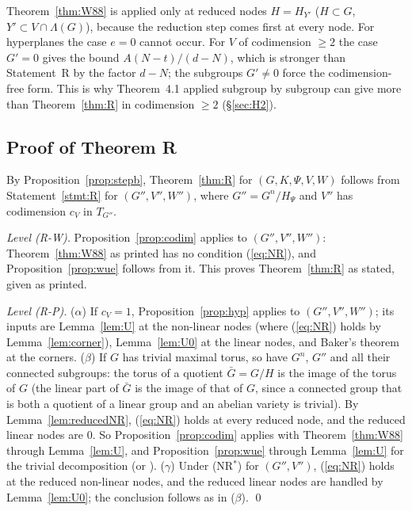 \documentclass[11pt]{amsart}
\theoremstyle{definition}
\begin{document}
\noindent Theorem~\ref{thm:W88} is applied only at reduced nodes $H=H_{Y'}$ ($H\subset G$, $Y'\subset V\cap\Lambda(G)$), because
the reduction step comes first at every node. For hyperplanes the case $e=0$ cannot occur. For $V$ of codimension $\ge2$
the case $G'=0$ gives the bound $A(N-t)/(d-N)$, which is stronger than Statement~R by the factor $d-N$; the subgroups
$G'\ne0$ force the codimension-free form. This is why Theorem~4.1 applied subgroup by subgroup can give more than
Theorem~\ref{thm:R} in codimension $\ge2$ (\S\ref{sec:H2}).

\subsection{Proof of Theorem R}\label{sec:proofRfin}
By Proposition~\ref{prop:stepb}, Theorem~\ref{thm:R} for $(G,K,\Psi,V,W)$ follows from Statement~\ref{stmt:R} for
$(G'',V'',W'')$, where $G''=G^n/H_\Psi$ and $V''$ has codimension $c_V$ in $T_{G''}$.

\emph{Level (R-W).} Proposition~\ref{prop:codim} applies to $(G'',V'',W'')$: Theorem~\ref{thm:W88} as printed has no
condition (\ref{eq:NR}), and Proposition~\ref{prop:wue} follows from it. This proves Theorem~\ref{thm:R} as stated, given
\cite[Thm.~4.1]{W88} as printed.

\emph{Level (R-P).}
($\alpha$) If $c_V=1$, Proposition~\ref{prop:hyp} applies to $(G'',V'',W'')$; its inputs are Lemma~\ref{lem:U} at the
non-linear nodes (where (\ref{eq:NR}) holds by Lemma~\ref{lem:corner}), Lemma~\ref{lem:U0} at the linear nodes, and Baker's
theorem at the corners.
($\beta$) If $G$ has trivial maximal torus, so have $G^n$, $G''$ and all their connected subgroups: the torus of a quotient
$\bar G=G/H$ is the image of the torus of $G$ (the linear part of $\bar G$ is the image of that of $G$, since a connected
group that is both a quotient of a linear group and an abelian variety is trivial). By Lemma~\ref{lem:reducedNR},
(\ref{eq:NR}) holds at every reduced node, and the reduced linear nodes are $0$. So Proposition~\ref{prop:codim} applies
with Theorem~\ref{thm:W88} through Lemma~\ref{lem:U}, and Proposition~\ref{prop:wue} through Lemma~\ref{lem:U} for the
trivial decomposition (or \cite{Wu89}).
($\gamma$) Under (NR$^*$) for $(G'',V'')$, (\ref{eq:NR}) holds at the reduced non-linear nodes, and the reduced linear nodes
are handled by Lemma~\ref{lem:U0}; the conclusion follows as in ($\beta$). \qed
\end{document}
